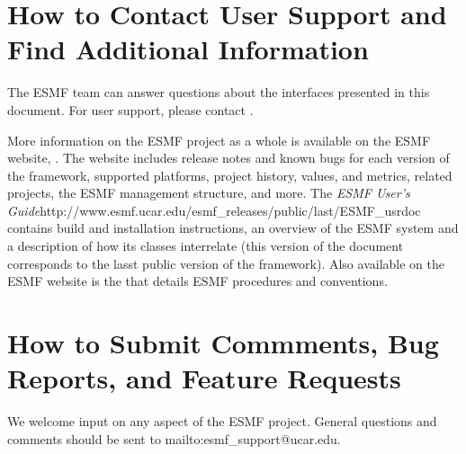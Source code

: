 \section{How to Contact User Support and Find Additional Information}
\label{sec:Support}
The ESMF team can answer questions about the interfaces presented in this 
document.  For user support, please contact 
.  

More information on the ESMF project as a whole is available on the 
ESMF website, .  
The website includes release notes and known bugs for each version of the
framework, supported platforms, project history, values, and metrics, related projects,
the ESMF management structure, and more.  The \htmladdnormallink
{{\it ESMF User's Guide}}{http://www.esmf.ucar.edu/esmf_releases/public/last/ESMF_usrdoc} contains build and installation instructions, an overview of the ESMF system and a description of 
how its classes interrelate (this version of the document corresponds to the lasst public version of the framework).  Also available on the ESMF website is the 
that details ESMF procedures and conventions.  
 
\section{How to Submit Commments, Bug Reports, and Feature Requests}
\label{sec:Submission}
We welcome input on any aspect of the ESMF project.  General 
questions and comments should be sent to 
{mailto:esmf\_support@ucar.edu}.






